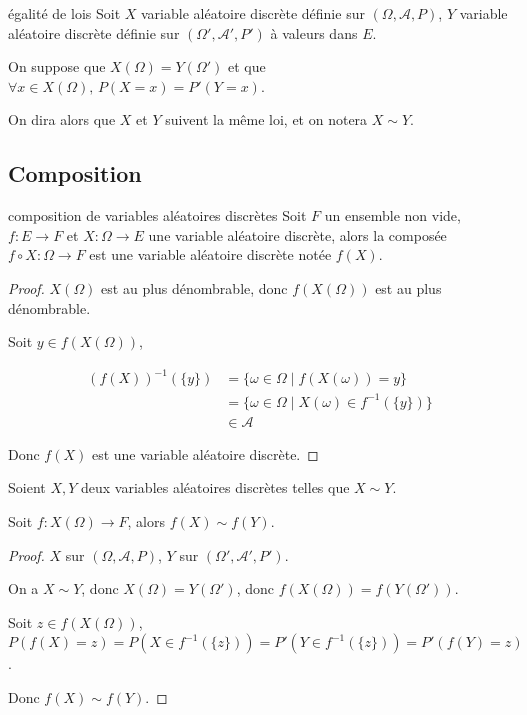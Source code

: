 \begin{definition}{égalité de lois}{}
    Soit $X$ variable aléatoire discrète définie sur $(\Omega, \mathcal A, P)$, $Y$ variable aléatoire discrète définie 
    sur $(\Omega', \mathcal A', P')$ à valeurs dans $E$.

    On suppose que $X(\Omega) = Y(\Omega')$ et que $\forall x \in X(\Omega), \, P(X = x) = P'(Y = x)$.

    On dira alors que $X$ et $Y$ suivent la même loi, et on notera $X \sim Y$.
\end{definition}

\subsection{Composition}

\begin{theoreme}{composition de variables aléatoires discrètes}{}
    Soit $F$ un ensemble non vide, $f : E \to F$ et $X : \Omega \to E$ une variable aléatoire discrète, 
    alors la composée $f \circ X : \Omega \to F$ est une variable aléatoire discrète notée $f(X)$.
\end{theoreme}

\begin{proof}
    $X(\Omega)$ est au plus dénombrable, donc $f(X(\Omega))$ est au plus dénombrable.

    Soit $y \in f(X(\Omega))$, 

    \begin{align}
        (f(X))^{-1}(\{y\}) & = \{\omega \in \Omega \mid f(X(\omega)) = y\} \\
        & = \{\omega \in \Omega \mid X(\omega) \in f^{-1}(\{y\})\} \\
        & \in \mathcal A
    \end{align}

    Donc $f(X)$ est une variable aléatoire discrète.
\end{proof}

\begin{theoreme}{}{}
    Soient $X, Y$ deux variables aléatoires discrètes telles que $X \sim Y$. 

    Soit $f : X(\Omega) \to F$, alors $f(X) \sim f(Y)$.
\end{theoreme}

\begin{proof}
    $X$ sur $(\Omega, \mathcal A, P)$, $Y$ sur $(\Omega', \mathcal A', P')$.

    On a $X \sim Y$, donc $X(\Omega) = Y(\Omega')$, donc $f(X(\Omega)) = f(Y(\Omega'))$.

    Soit $z \in f(X(\Omega))$, $P(f(X) = z) = P(X \in f^{-1}(\{z\})) = P'(Y \in f^{-1}(\{z\})) = P'(f(Y) = z)$.

    Donc $f(X) \sim f(Y)$.
\end{proof}

